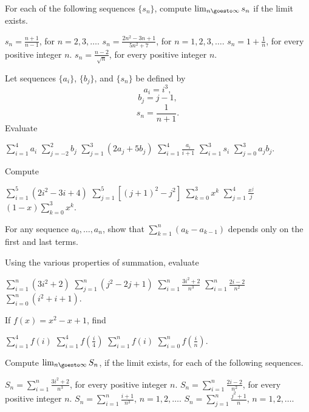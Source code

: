 \begin{exercises}

For each of the following sequences $\{s_n\}$,
compute $\lim_{n \goesto \infty} s_n$ if the limit exists.
\begin{exenum}
\x
$s_n = \frac{n+1}{n-1}$, for $n = 2,3,\ldots$.
\x
$s_n = \frac{2n^2 - 3n + 1}{5n^2 + 7}$,
for $n = 1,2,3,\ldots$.
\x
$s_n = 1 + \frac1n$, for every positive integer $n$.
\x
$s_n = \frac{n-2}{\sqrt n}$, for every positive integer $n$.
\end{exenum}

Let sequences $\{a_i\}$, $\{b_j\}$, and $\{s_n\}$
be defined by
\[
a_i = i^3,
\]
\[
b_j = j-1,
\]
\[
s_n = \frac1{n+1}.
\]
Evaluate
\begin{exenum}
\x
$\sum_{i=1}^4 a_i$
\x
$\sum_{j=-2}^2 b_j$
\x
$\sum_{j=1}^3 (2a_j + 5b_j)$
\x
$\sum_{i=1}^4 \frac{a_i}{i+1}$
\x
$\sum_{i=1}^3 s_i$
\x
$\sum_{j=0}^3 a_jb_j$.
\end{exenum}

Compute
\begin{exenum}
\x
$\sum_{i=1}^5 (2i^2 - 3i + 4)$
\x
$\sum_{j=1}^5 [(j+1)^2 - j^2]$
\x
$\sum_{k=0}^3 x^k$
\x
$\sum_{j=1}^4 \frac{x^j}j$
\x
$(1-x) \sum_{k=0}^3 x^k$.
\end{exenum}

For any sequence $a_0, \ldots, a_n$, show that
$\sum_{k=1}^n (a_k - a_{k-1})$
depends only on the first and last terms.

Using the various properties of summation, evaluate
\begin{exenum}
\x
$\sum_{i=1}^n (3i^2 + 2)$
\x
$\sum_{j=1}^n (j^2 - 2j + 1)$
\x
$\sum_{i=1}^n \frac{3i^2 + 2}{n^3}$
\x
$\sum_{i=1}^n \frac{2i-2}{n^2}$
\x
$\sum_{i=0}^n (i^2 + i + 1)$.
\end{exenum}

If $f(x) = x^2 - x + 1$, find
\begin{exenum}
\x
$\sum_{i=1}^4 f(i)$
\x
$\sum_{i=1}^4 f\left( \frac i4 \right)$
\x
$\sum_{i=1}^n f(i)$
\x
$\sum_{i=0}^n f\left( \frac in \right)$.
\end{exenum}

Compute $\lim_{n\goesto\infty} S_n$, if the limit exists,
for each of the following sequences.
\begin{exenum}
\x
$S_n = \sum_{i=1}^n \frac{3i^2 + 2}{n^3}$,
for every positive integer $n$.
\x
$S_n = \sum_{i=1}^n \frac{2i-2}{n^2}$,
for every positive integer $n$.
\x
$S_n = \sum_{i=1}^n \frac{i+1}{n^3}$,
$n = 1,2,\ldots$.
\x
$S_n = \sum_{j=1}^n \frac{j^2+1}n$,
$n = 1,2,\ldots$.
\end{exenum}


\end{exercises}
